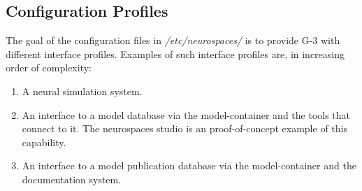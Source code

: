 \documentclass[12pt]{article}
\begin{document}
\subsection*{Configuration Profiles}

The goal of the configuration files in {\it /etc/neurospaces/} is to
provide G-3 with different interface profiles.  Examples of such
interface profiles are, in increasing order of complexity:
\begin{enumerate}
\item A neural simulation system.
\item An interface to a model database via the model-container and the
  tools that connect to it.  The neurospaces studio is an
  proof-of-concept example of this capability.
\item An interface to a model publication database via the
  model-container and the documentation system.
\end{enumerate}




\end{document}
